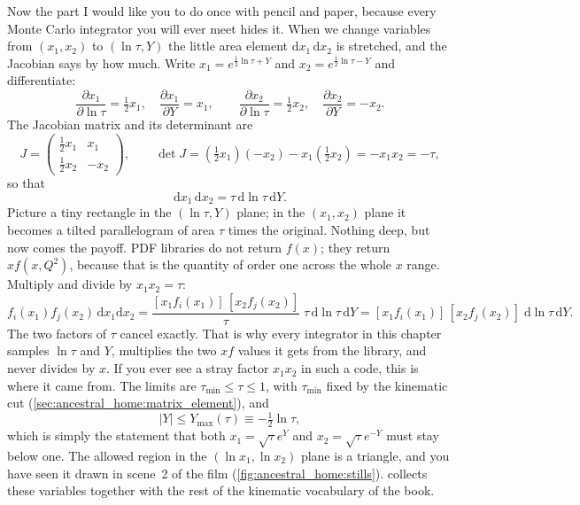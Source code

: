 Now the part I would like you to do once with pencil and paper, because
every Monte Carlo integrator you will ever meet hides it. When we change
variables from $(x_1,x_2)$ to $(\ln\tau,Y)$ the little area element
$\mathrm{d}x_1\,\mathrm{d}x_2$ is stretched, and the Jacobian says by how
much. Write $x_1=e^{\frac12\ln\tau+Y}$ and $x_2=e^{\frac12\ln\tau-Y}$ and
differentiate:
\begin{equation}
  \frac{\partial x_1}{\partial\ln\tau}=\tfrac12x_1,\quad
  \frac{\partial x_1}{\partial Y}=x_1,\qquad
  \frac{\partial x_2}{\partial\ln\tau}=\tfrac12x_2,\quad
  \frac{\partial x_2}{\partial Y}=-x_2 .
\end{equation}
The Jacobian matrix and its determinant are
\begin{equation}
  J=\begin{pmatrix}\tfrac12x_1 & x_1\\[2pt] \tfrac12x_2 & -x_2\end{pmatrix},
  \qquad
  \det J=\left(\tfrac12x_1\right)(-x_2)-x_1\left(\tfrac12x_2\right)=-x_1x_2=-\tau,
\end{equation}
so that
\begin{equation}
  \mathrm{d}x_1\,\mathrm{d}x_2=\tau\,\mathrm{d}\ln\tau\,\mathrm{d}Y .
  \label{eq:ancestral_home:jacobian}
\end{equation}
Picture a tiny rectangle in the $(\ln\tau,Y)$ plane; in the $(x_1,x_2)$
plane it becomes a tilted parallelogram of area $\tau$ times the original.
Nothing deep, but now comes the payoff. PDF libraries do not return $f(x)$;
they return $x f(x,Q^2)$, because that is the quantity of order one across
the whole $x$ range. Multiply and divide by $x_1x_2=\tau$:
\begin{equation}
  f_i(x_1)f_j(x_2)\,\mathrm{d}x_1\mathrm{d}x_2
  = \frac{[x_1f_i(x_1)]\,[x_2f_j(x_2)]}{\tau}\;\tau\,\mathrm{d}\ln\tau\,\mathrm{d}Y
  = [x_1f_i(x_1)]\,[x_2f_j(x_2)]\;\mathrm{d}\ln\tau\,\mathrm{d}Y .
  \label{eq:ancestral_home:xf}
\end{equation}
The two factors of $\tau$ cancel exactly. That is why every integrator in this
chapter samples $\ln\tau$ and $Y$, multiplies the two $xf$ values it gets
from the library, and never divides by $x$. If you ever see a stray factor
$x_1x_2$ in such a code, this is where it came from. The limits are
$\tau_{\min}\le\tau\le1$, with $\tau_{\min}$ fixed by the kinematic cut
(\cref{sec:ancestral_home:matrix_element}), and
\begin{equation}
  |Y|\le Y_{\max}(\tau)\equiv-\tfrac12\ln\tau ,
  \label{eq:ancestral_home:ymax}
\end{equation}
which is simply the statement that both $x_1=\sqrt\tau e^{Y}$ and
$x_2=\sqrt\tau e^{-Y}$ must stay below one. The allowed region in the
$(\ln x_1,\ln x_2)$ plane is a triangle, and you have seen it drawn in
scene~2 of the film (\cref{fig:ancestral_home:stills}).  collects these
variables together with the rest of the kinematic vocabulary of the book.

